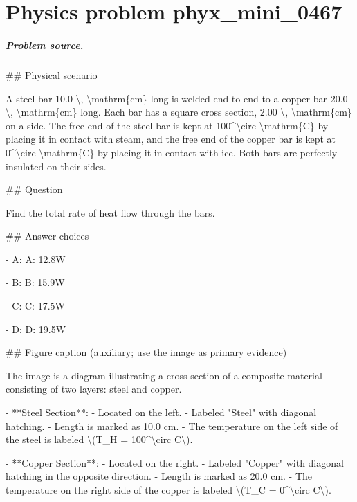 
\chapter{Physics problem phyx\_mini\_0467}
\label{ch:PhyXMiniProblems_problem_phyx_mini_0467}

\paragraph{Problem source.}
\#\# Physical scenario

A steel bar 10.0 \textbackslash{}, \textbackslash{}mathrm\{cm\} long is welded end to end to a copper bar 20.0 \textbackslash{}, \textbackslash{}mathrm\{cm\} long. Each bar has a square cross section, 2.00 \textbackslash{}, \textbackslash{}mathrm\{cm\} on a side. The free end of the steel bar is kept at 100\textasciicircum{}\textbackslash{}circ \textbackslash{}mathrm\{C\} by placing it in contact with steam, and the free end of the copper bar is kept at 0\textasciicircum{}\textbackslash{}circ \textbackslash{}mathrm\{C\} by placing it in contact with ice. Both bars are perfectly insulated on their sides.

\#\# Question

Find the total rate of heat flow through the bars.

\#\# Answer choices

- A: A: 12.8W

- B: B: 15.9W

- C: C: 17.5W

- D: D: 19.5W

\#\# Figure caption (auxiliary; use the image as primary evidence)

The image is a diagram illustrating a cross-section of a composite material consisting of two layers: steel and copper. 

- **Steel Section**: 
  - Located on the left.
  - Labeled "Steel" with diagonal hatching.
  - Length is marked as 10.0 cm.
  - The temperature on the left side of the steel is labeled \textbackslash{}(T\_H = 100\textasciicircum{}\textbackslash{}circ C\textbackslash{}).

- **Copper Section**: 
  - Located on the right.
  - Labeled "Copper" with diagonal hatching in the opposite direction.
  - Length is marked as 20.0 cm.
  - The temperature on the right side of the copper is labeled \textbackslash{}(T\_C = 0\textasciicircum{}\textbackslash{}circ C\textbackslash{}).

